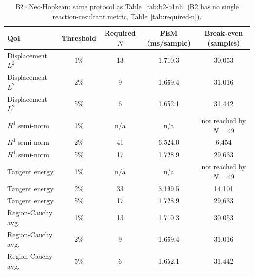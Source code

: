 \documentclass[final,5p,times]{elsarticle}
\begin{document}
\begin{table}[ht]
\centering
\caption{B2$\times$Neo-Hookean: same protocol as Table~\ref{tab:b2-b1nh}
  (B2 has no single reaction-resultant metric, Table~\ref{tab:required-n}).}
\label{tab:b2-b2nh}
\small
\begin{tabular}{lcccc}
\toprule
QoI & Threshold & Required $N$ & FEM (ms/sample) & Break-even (samples) \\
\midrule
Displacement $L^2$  & 1\% & 13  & 1{,}710.3 & 30{,}053 \\
Displacement $L^2$  & 2\% & 9   & 1{,}669.4 & 31{,}016 \\
Displacement $L^2$  & 5\% & 6   & 1{,}652.1 & 31{,}442 \\
$H^1$ semi-norm     & 1\% & n/a & n/a       & not reached by $N{=}49$ \\
$H^1$ semi-norm     & 2\% & 41  & 6{,}524.0 & 6{,}454 \\
$H^1$ semi-norm     & 5\% & 17  & 1{,}728.9 & 29{,}633 \\
Tangent energy      & 1\% & n/a & n/a       & not reached by $N{=}49$ \\
Tangent energy      & 2\% & 33  & 3{,}199.5 & 14{,}101 \\
Tangent energy      & 5\% & 17  & 1{,}728.9 & 29{,}633 \\
Region-Cauchy avg.\ & 1\% & 13  & 1{,}710.3 & 30{,}053 \\
Region-Cauchy avg.\ & 2\% & 9   & 1{,}669.4 & 31{,}016 \\
Region-Cauchy avg.\ & 5\% & 6   & 1{,}652.1 & 31{,}442 \\
\bottomrule
\end{tabular}
\end{table}
\end{document}
